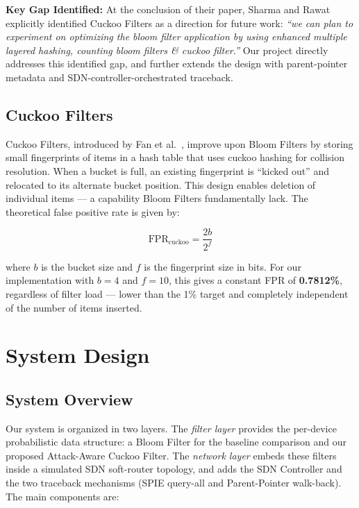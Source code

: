 \documentclass[12pt, a4paper]{report}
\begin{document}
\begin{infobox}
\textbf{Key Gap Identified:} At the conclusion of their paper, Sharma and
Rawat explicitly identified Cuckoo Filters as a direction for future work:
\textit{``we can plan to experiment on optimizing the bloom filter
application by using enhanced multiple layered hashing, counting bloom
filters \& cuckoo filter.''} Our project directly addresses this
identified gap, and further extends the design with parent-pointer
metadata and SDN-controller-orchestrated traceback.
\end{infobox}

\section{Cuckoo Filters}

Cuckoo Filters, introduced by Fan et al.\ \cite{fan2014cuckoo}, improve
upon Bloom Filters by storing small fingerprints of items in a hash table
that uses cuckoo hashing for collision resolution. When a bucket is full,
an existing fingerprint is ``kicked out'' and relocated to its alternate
bucket position. This design enables deletion of individual items --- a
capability Bloom Filters fundamentally lack. The theoretical false positive
rate is given by:

\begin{equation}
  \text{FPR}_{\text{cuckoo}} = \frac{2b}{2^f}
\end{equation}

where $b$ is the bucket size and $f$ is the fingerprint size in bits. For
our implementation with $b=4$ and $f=10$, this gives a constant FPR of
\textbf{0.7812\%}, regardless of filter load --- lower than the 1\% target
and completely independent of the number of items inserted.

\chapter{System Design}

\section{System Overview}

Our system is organized in two layers. The \textit{filter layer} provides
the per-device probabilistic data structure: a Bloom Filter for the
baseline comparison and our proposed Attack-Aware Cuckoo Filter. The
\textit{network layer} embeds these filters inside a simulated SDN
soft-router topology, and adds the SDN Controller and the two traceback
mechanisms (SPIE query-all and Parent-Pointer walk-back). The main
components are:
\end{document}
